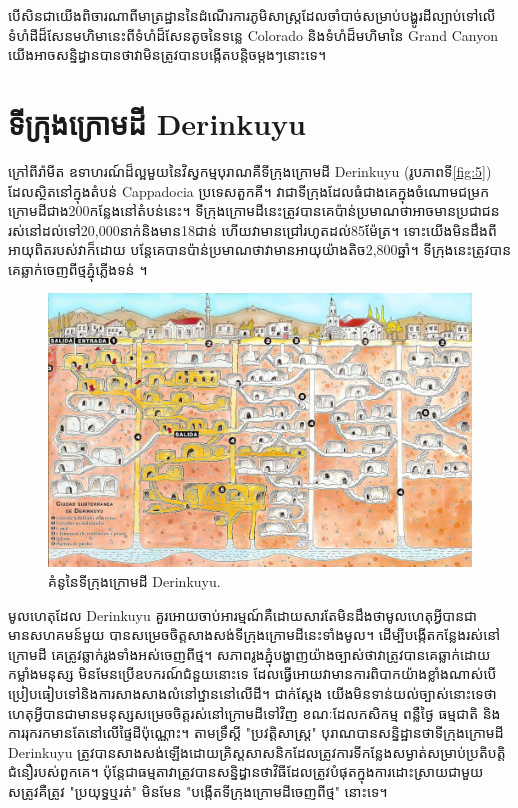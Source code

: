 \documentclass[10pt,twocolumn,letterpaper]{article}
\begin{document}
បើសិនជាយើងពិចារណាពីមាត្រដ្ឋាននៃដំណើរការភូមិសាស្ត្រដែលចាំបាច់សម្រាប់បង្ហូរដីល្បាប់ទៅលើទំហំដីដ៏សែនមហិមានេះពីទំហំដ៏សែនតូចនៃទន្លេ Colorado និងទំហំដ៏មហិមានៃ Grand Canyon យើងអាចសន្និដ្ធានបានថាវាមិនត្រូវបានបង្កើតបន្តិចម្តងៗនោះទេ។

\section{ទីក្រុងក្រោមដី Derinkuyu}

ក្រៅពីរ៉ាមីត ឧទាហរណ៍ដ៏ល្អមួយនៃវិស្វកម្មបុរាណគឺទីក្រុងក្រោមដី Derinkuyu (រូបភាពទី\ref{fig:5}) ដែលស្ថិតនៅក្នុងតំបន់ Cappadocia ប្រទេសតួកគី។ វាជាទីក្រុងដែលធំជាងគេក្នុងចំណោមជម្រកក្រោមដីជាង200កន្លែងនៅតំបន់នេះ\cite{54}។ ទីក្រុងក្រោមដីនេះត្រូវបានគេប៉ាន់ប្រមាណថាអាចមានប្រជាជនរស់នៅដល់ទៅ20,000នាក់និងមាន18ជាន់ ហើយវាមានជ្រៅរហូតដល់85ម៉ែត្រ។ ទោះយើងមិនដឹងពីអាយុពិតរបស់វាក៏ដោយ បន្តែគេបានប៉ាន់ប្រមាណថាវាមានអាយុយ៉ាងតិច2,800ឆ្នាំ។ ទីក្រុងនេះត្រូវបានគេឆ្លាក់ចេញពីថ្មភ្នុំភ្លើងទន់ \cite{52, 53}។

\begin{figure}[b]
\begin{center}

   \includegraphics[width=1\linewidth]{derinkuyu.jpeg}
\end{center}
   \caption{គំនូនៃទីក្រុងក្រោមដី Derinkuyu\cite{56}.}
\label{fig:5}
\label{fig:onecol}
\end{figure}

មូលហេតុដែល Derinkuyu គួរអោយចាប់អារម្មណ៍គឺដោយសារតែមិនដឹងថាមូលហេតុអ្វីបានជាមានសហគមន៍មួយ បានសម្រេចចិត្តសាងសង់ទីក្រុងក្រោមដីនេះទាំងមូល។ ដើម្បីបង្កើតកន្លែងរស់នៅក្រោមដី គេត្រូវឆ្លាក់រូងទាំងអស់ចេញពីថ្ម។ សភាពរូងភ្នុំបង្ហាញយ៉ាងច្បាស់ថាវាត្រូវបានគេឆ្លាក់ដោយកម្លាំងមនុស្ស មិនមែនប្រើឧបករណ៍ជំនួយនោះទេ ដែលធ្វើអោយវាមានការពិបាកយ៉ាងខ្លាំងណាស់បើប្រៀបធៀបទៅនិងការសាងសាងលំនៅឋ្ឋាននៅលើដី។ ជាក់ស្តែង យើងមិនទាន់យល់ច្បាស់នោះទេថាហេតុអ្វីបានជាមានមនុស្សសម្រេចចិត្តរស់នៅក្រោមដីទៅវិញ ខណៈដែលកសិកម្ម ពន្លឺថ្ងៃ ធម្មជាតិ និងការរុករកមានតែនៅលើផ្ទៃដីប៉ុណ្ណោះ។ តាមទ្រឹស្តី "ប្រវត្តិសាស្រ្ត" បុរាណបានសន្និដ្ឋានថាទីក្រុងក្រោមដី Derinkuyu ត្រូវបានសាងសង់ឡើងដោយគ្រិស្ដសាសនិកដែលត្រូវការទីកន្លែងសម្ងាត់សម្រាប់ប្រតិបត្តិជំនឿរបស់ពួកគេ\cite{53}។ ប៉ុន្តែជាធម្មតាវាត្រូវបានសន្និដ្ធានថា​វិធីដែលត្រូវបំផុតក្នុងការដោះស្រាយជាមួយសត្រូវគឺត្រូវ "ប្រយុទ្ធឬរត់" មិនមែន "បង្កើតទីក្រុងក្រោមដីចេញពីថ្ម" នោះទេ។
\end{document}
